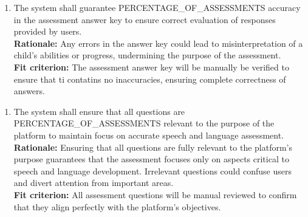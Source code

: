 \documentclass[12pt]{article}
\begin{document}
\begin{enumerate}[label={PR-PA}4. ]
  \item The system shall guarantee PERCENTAGE\_OF\_ASSESSMENTS accuracy in the assessment answer key to ensure correct evaluation of responses provided by users.\\
  \textbf{Rationale: }Any errors in the answer key could lead to misinterpretation of a child’s abilities or progress, undermining the purpose of the assessment.\\
  \textbf{Fit criterion: }The assessment answer key will be manually be verified to ensure that ti contatins no inaccuracies, ensuring complete correctness of answers.  
\end{enumerate}
\begin{enumerate}[label={PR-PA}5. ]
  \item The system shall ensure that all questions are PERCENTAGE\_OF\_ASSESSMENTS relevant to the purpose of the platform to maintain focus on accurate speech and language assessment.\\
  \textbf{Rationale: }Ensuring that all questions are fully relevant to the platform’s purpose guarantees that the assessment focuses only on aspects critical to speech and language development. Irrelevant questions could confuse users and divert attention from important areas.\\
  \textbf{Fit criterion: }All assessment questions will be manual reviewed to confirm that they align perfectly with the platform's objectives.  
\end{enumerate}
\end{document}
